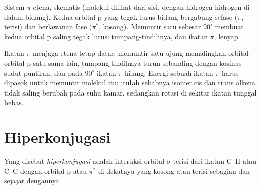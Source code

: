 \begin{omfigure}

{\small Sistem $\pi$ etena, skematis (molekul dilihat dari sisi, dengan
hidrogen-hidrogen di dalam bidang). Kedua orbital p yang tegak lurus
bidang bergabung sefase ($\pi$, terisi) dan berlawanan fase ($\pi^*$,
kosong). Memuntir satu  sebesar $90^\circ$ membuat kedua orbital p
saling tegak lurus: tumpang-tindihnya, dan ikatan $\pi$, lenyap.}
\end{omfigure}

Ikatan $\pi$ menjaga etena tetap datar: memuntir satu ujung memalingkan
orbital-orbital p satu sama lain, tumpang-tindihnya turun sebanding dengan
kosinus sudut puntiran, dan pada $90^\circ$ ikatan $\pi$ hilang. Energi
sebuah ikatan $\pi$ harus dipasok untuk memuntir molekul itu; itulah
sebabnya isomer cis dan trans alkena tidak saling berubah pada suhu kamar,
sedangkan rotasi di sekitar ikatan tunggal bebas.

\section{Hiperkonjugasi}

\begin{definition}[Hiperkonjugasi]\label{def:b2:fragment-orbitals:hyperconjugation}
Yang disebut \emph{hiperkonjugasi} adalah interaksi
orbital $\sigma$ terisi dari ikatan C--H atau C--C dengan orbital p atau
$\pi^*$ di dekatnya yang kosong atau terisi sebagian dan sejajar dengannya.
\end{definition}

